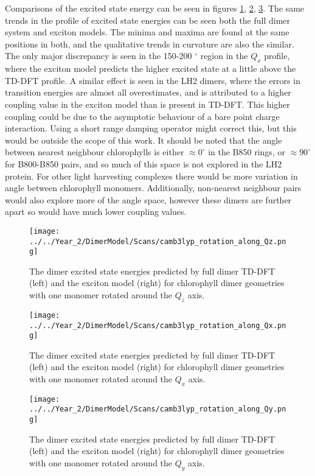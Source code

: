 Comparisons of the excited state energy can be seen in figures \ref{fig:camb3lyp_Qz_rotation},
\ref{fig:camb3lyp_Qx_rotation}, \ref{fig:camb3lyp_Qy_rotation}. The same trends 
in the profile of excited state energies can be seen both the full dimer system 
and exciton models. The minima and maxima are found at the same positions in both, 
and the qualitative trends in curvature are also the similar. The only major discrepancy
is seen in the 150-200 $^{\circ}$ region in the $Q_x$ profile, where the exciton 
model predicts the higher excited state at a little above the TD-DFT profile. A 
similar effect is seen in the LH2 dimers, where the errors in transition energies 
are almost all overestimates, and is attributed to a higher coupling value in the
exciton model than is present in TD-DFT. This higher coupling could be due to the
asymptotic behaviour of a bare point charge interaction. Using a short range damping
operator might correct this, but this would be outside the scope of this work.
It should be noted that the angle between nearest neighbour chlorophylls is either
$\approx 0 ^{\circ}$ in the B850 rings, or $\approx 90 ^{\circ}$ for B800-B850 pairs,
and so much of this space is not explored in the LH2 protein. For other light 
harvesting complexes there would be more variation in angle between chlorophyll 
monomers. Additionally, non-nearest neighbour pairs would also explore more of the 
angle space, however these dimers are further apart so would have much lower coupling
values.

\begin{figure}
    \centering
    \texttt{[image: ../../Year\_2/DimerModel/Scans/camb3lyp\_rotation\_along\_Qz.png]}
    \label{fig:camb3lyp_Qz_rotation}
    \caption{The dimer excited state energies predicted by full dimer TD-DFT (left)
    and the exciton model (right) for chlorophyll dimer geometries with one monomer
    rotated around the $Q_z$ axis.}
\end{figure}

\begin{figure}
    \centering
    \texttt{[image: ../../Year\_2/DimerModel/Scans/camb3lyp\_rotation\_along\_Qx.png]}
    \label{fig:camb3lyp_Qx_rotation}
    \caption{The dimer excited state energies predicted by full dimer TD-DFT (left)
    and the exciton model (right) for chlorophyll dimer geometries with one monomer
    rotated around the $Q_x$ axis.}
\end{figure}

\begin{figure}
    \centering
    \texttt{[image: ../../Year\_2/DimerModel/Scans/camb3lyp\_rotation\_along\_Qy.png]}
    \label{fig:camb3lyp_Qy_rotation}
    \caption{The dimer excited state energies predicted by full dimer TD-DFT (left)
    and the exciton model (right) for chlorophyll dimer geometries with one monomer
    rotated around the $Q_y$ axis.}
\end{figure}

